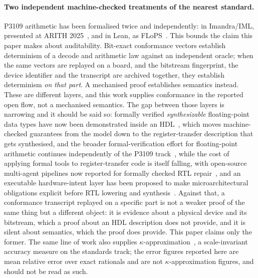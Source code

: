 \paragraph{Two independent machine-checked treatments of the nearest standard.}
P3109 arithmetic has been formalised twice and independently: in Imandra/IML,
presented at ARITH 2025~\cite{wintersteiger2025}, and in Lean, as
FLoPS~\cite{flops2026}. This bounds the claim this paper makes about
auditability. Bit-exact conformance vectors establish determinism of a decode
and arithmetic law against an independent oracle; when the same vectors are
replayed on a board, and the bitstream fingerprint, the device identifier and the
transcript are archived together, they establish determinism \emph{on that part}.
A mechanised proof establishes semantics instead. These are different layers, and
this work supplies conformance in the reported open flow, not a mechanised
semantics. The gap between those layers is narrowing and it should be said so:
formally verified \emph{synthesizable} floating-point data types have now been
demonstrated inside an HDL~\cite{archhdl2026}, which moves machine-checked
guarantees from the model down to the register-transfer description that gets
synthesised, and the broader formal-verification effort for floating-point
arithmetic continues independently of the P3109 track~\cite{mohanty2025}, while
the cost of applying formal tools to register-transfer code is itself falling, with
open-source multi-agent pipelines now reported for formally checked RTL
repair~\cite{tran2026rtlrepair}, and an executable hardware-intent layer has been
proposed to make microarchitectural obligations explicit before RTL lowering
and synthesis~\cite{cheng2026hint}. Against
that, a conformance transcript replayed on a specific part is not a weaker proof
of the same thing but a different object: it is evidence about a physical device
and its bitstream, which a proof about an HDL description does not provide, and it
is silent about semantics, which the proof does provide. This paper claims only
the former. The same line of
work also supplies $\kappa$-approximation~\cite{fitzgibbon2026kappa}, a
scale-invariant accuracy measure on the standards track; the error figures
reported here are mean relative error over exact rationals and are not
$\kappa$-approximation figures, and should not be read as such.

